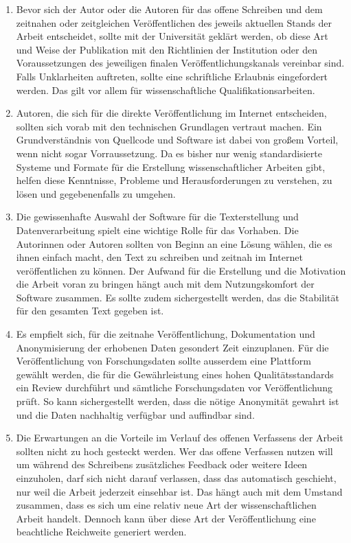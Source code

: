 \begin{enumerate}
\item Bevor sich der Autor oder die Autoren für das offene Schreiben und dem zeitnahen oder zeitgleichen Veröffentlichen des jeweils aktuellen Stands der Arbeit entscheidet, sollte mit der Universität geklärt werden, ob diese Art und Weise der Publikation mit den Richtlinien der Institution oder den Voraussetzungen des jeweiligen finalen Veröffentlichungskanals vereinbar sind. Falls Unklarheiten auftreten, sollte eine schriftliche Erlaubnis eingefordert werden. Das gilt vor allem für wissenschaftliche Qualifikationsarbeiten.
\item Autoren, die sich für die direkte Veröffentlichung im Internet entscheiden, sollten sich vorab mit den technischen Grundlagen vertraut machen. Ein Grundverständnis von Quellcode und Software ist dabei von großem Vorteil, wenn nicht sogar Vorraussetzung. Da es bisher nur wenig standardisierte Systeme und Formate für die Erstellung wissenschaftlicher Arbeiten gibt, helfen diese Kenntnisse, Probleme und Herausforderungen zu verstehen, zu lösen und gegebenenfalls zu umgehen.
\item Die gewissenhafte Auswahl der Software für die Texterstellung und Datenverarbeitung spielt eine wichtige Rolle für das Vorhaben. Die Autorinnen oder Autoren sollten von Beginn an eine Lösung wählen, die es ihnen einfach macht, den Text zu schreiben und zeitnah im Internet veröffentlichen zu können. Der Aufwand für die Erstellung und die Motivation die Arbeit voran zu bringen hängt auch mit dem Nutzungskomfort der Software zusammen. Es sollte zudem sichergestellt werden, das die Stabilität für den gesamten Text gegeben ist.
\item Es empfielt sich, für die zeitnahe Veröffentlichung, Dokumentation und Anonymisierung der erhobenen Daten gesondert Zeit einzuplanen. Für die Veröffentlichung von Forschungsdaten sollte ausserdem eine Plattform gewählt werden, die für die Gewährleistung eines hohen Qualitätsstandards ein Review durchführt und sämtliche Forschungsdaten vor Veröffentlichung prüft. So kann sichergestellt werden, dass die nötige Anonymität gewahrt ist und die Daten nachhaltig verfügbar und auffindbar sind.
\item Die Erwartungen an die Vorteile im Verlauf des offenen Verfassens der Arbeit sollten nicht zu hoch gesteckt werden. Wer das offene Verfassen nutzen will um während des Schreibens zusätzliches Feedback oder weitere Ideen einzuholen, darf sich nicht darauf verlassen, dass das automatisch geschieht, nur weil die Arbeit jederzeit einsehbar ist. Das hängt auch mit dem Umstand zusammen, dass es sich um eine relativ neue Art der wissenschaftlichen Arbeit handelt. Dennoch kann über diese Art der Veröffentlichung eine beachtliche Reichweite generiert werden.

\end{enumerate}
